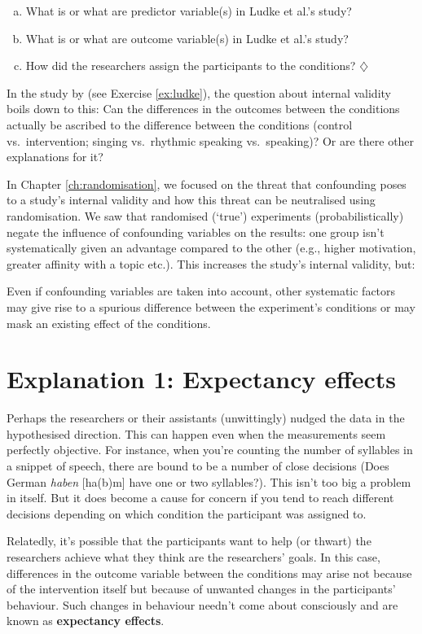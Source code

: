 \documentclass[a4paper]{tufte-book}\usepackage[]{graphicx}\usepackage[]{xcolor}
\newcommand{\term}[1]{\textbf{#1}}
\newcommand*{\parend}[1][$\diamondsuit$]{%
  \unskip\nobreak\hspace{1em plus 1fill}$\diamondsuit$%
}
\begin{document}
\begin{enumerate}[(a)]
  \item What is or what are predictor variable(s) in Ludke et al.'s study?
  \item What is or what are outcome variable(s) in Ludke et al.'s study?
  \item How did the researchers assign the participants to the conditions?\parend
\end{enumerate}

In the study by \citet{Ludke2014} (see Exercise \ref{ex:ludke}), 
the question about internal validity boils down to this:
Can the differences in the outcomes between the conditions actually 
be ascribed to the difference between the conditions 
(control vs.\ intervention; singing vs.\ rhythmic speaking vs.\ speaking)?
Or are there other explanations for it?

In Chapter \ref{ch:randomisation}, we focused on
the threat that confounding poses to a study's internal validity
and how this threat can be neutralised using randomisation.
We saw that randomised (`true') experiments (probabilistically)
negate the influence of confounding variables on the results:
one group isn't systematically given
an advantage compared to the other (e.g., higher motivation,
greater affinity with a topic etc.). This increases
the study's internal validity, but:

\begin{framed}
Even if confounding variables are
taken into account, other systematic factors may
give rise to a spurious difference between
the experiment's conditions or may mask an
existing effect of the conditions.
\end{framed}

\section{Explanation 1: Expectancy effects}
Perhaps the researchers or their assistants (unwittingly)
nudged the data in the hypothesised direction. 
This can happen even when the measurements seem perfectly objective. 
For instance, when you're counting the 
number of syllables in a snippet of speech, 
there are bound to be a number of close decisions
(Does German \textit{haben} [ha(b)m] have one or two syllables?).
This isn't too big a problem in itself.
But it does become a cause for concern 
if you tend to reach different decisions 
depending on which condition the participant was assigned to.

Relatedly, it's possible that the participants want to help (or thwart)
the researchers achieve what they think are the researchers' goals.
In this case, differences in the outcome variable between the conditions may arise
not because of the intervention itself but because of unwanted changes
in the participants' behaviour. Such changes in behaviour needn't come about
consciously and are known as \term{expectancy effects}.
\end{document}
